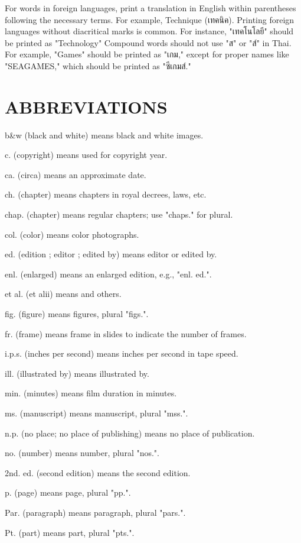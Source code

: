 For words in foreign languages, print a translation in English within parentheses following the necessary terms. For example, Technique (เทคนิค). Printing foreign languages without diacritical marks is common. For instance, "เทคโนโลยี" should be printed as "Technology" Compound words should not use "ส" or "ส์" in Thai. For example, "Games" should be printed as "เกม," except for proper names like "SEAGAMES," which should be printed as "ซีเกมส์."

\section{ABBREVIATIONS}

b\&w (black and white) means black and white images.

c. (copyright) means used for copyright year.

ca. (circa) means an approximate date.

ch. (chapter) means chapters in royal decrees, laws, etc.

chap. (chapter) means regular chapters; use "chaps." for plural.

col. (color) means color photographs.

ed. (edition ; editor ; edited by) means editor or edited by.

enl. (enlarged) means an enlarged edition, e.g., "enl. ed.".

et al. (et alii) means and others.

fig. (figure) means figures, plural "figs.".

fr. (frame) means frame in slides to indicate the number of frames.

i.p.s. (inches per second) means inches per second in tape speed.

ill. (illustrated by) means illustrated by.

min. (minutes) means film duration in minutes.

ms. (manuscript) means manuscript, plural "mss.".

n.p. (no place; no place of publishing) means no place of publication.

no. (number) means number, plural "nos.".

2nd. ed. (second edition) means the second edition.

p. (page) means page, plural "pp.".

Par. (paragraph) means paragraph, plural "pars.".

Pt. (part) means part, plural "pts.".

